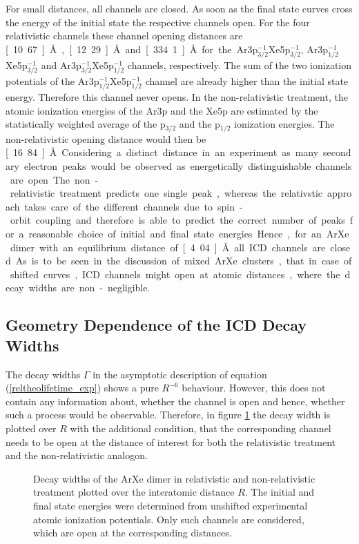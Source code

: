 For small distances, all channels are closed. As soon as the final
state curves cross the energy of the initial state
the respective channels open. For the four relativistic channels these
channel opening distances are
\unit[10.67]{\AA}, \unit[12.29]{\AA} and \unit[334.1]{\AA}
for the Ar3p$_{3/2}^{-1}$Xe5p$_{3/2}^{-1}$,
Ar3p$_{1/2}^{-1}$Xe5p$_{3/2}^{-1}$ and Ar3p$_{3/2}^{-1}$Xe5p$_{1/2}^{-1}$
channels, respectively.
The sum of the two ionization potentials of the
Ar3p$_{1/2}^{-1}$Xe5p$_{1/2}^{-1}$ channel are already higher than
the initial state energy. Therefore this channel never opens.
In the non-relativistic treatment, the atomic ionization energies of the
Ar3p and the Xe5p are estimated by the statistically weighted average of the
p$_{3/2}$ and the p$_{1/2}$ ionization energies. The non-relativistic
opening distance would then be
\unit[16.84]{\AA}.

Considering a distinct distance
in an experiment as many secondary electron peaks would be observed as
energetically distinguishable channels are open. The non-relativistic
treatment predicts one single peak, whereas the relativstic approach takes
care of the different channels due to spin-orbit coupling and therefore is
able to predict the correct number of peaks for a reasonable choice of initial
and final state energies.

Hence, for an ArXe dimer with an equilibrium distance of \unit[4.04]{\AA}
all ICD channels are closed. As is to be seen in the discussion of mixed
ArXe clusters, that in case of shifted curves, ICD channels might
open at atomic distances, where the decay widths are non-negligible.


\subsection{Geometry Dependence of the ICD Decay Widths}

The decay widths $\Gamma$ in the asymptotic description of equation
(\ref{reltheolifetime_exp}) shows a pure $R^{-6}$ behaviour.
However, this does not contain any information about, whether the channel is
open and hence, whether such a process would be observable. Therefore,
in figure \ref{figure:ArXe_gamma_unshifted} the decay width is plotted
over $R$ with the additional condition, that the corresponding channel needs
to be open at the distance of interest for both the relativistic treatment
and the non-relativistic analogon.

\begin{figure}[h]
  \centering
  
  \caption{Decay widths of the ArXe dimer in relativistic and non-relativistic
           treatment plotted over the interatomic
           distance $R$. The initial and final state energies were determined
           from unshifted experimental atomic ionization potentials. Only such
           channels are considered, which are open at the corresponding
           distances.}
  \label{figure:ArXe_gamma_unshifted}
\end{figure}

